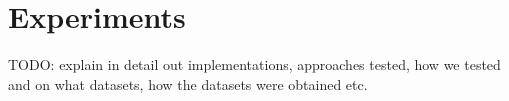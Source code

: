 \chapter{Experiments}
\label{chapter:experiments}
TODO: explain in detail out implementations, approaches tested, how we tested and on what datasets, how the datasets were obtained etc.
